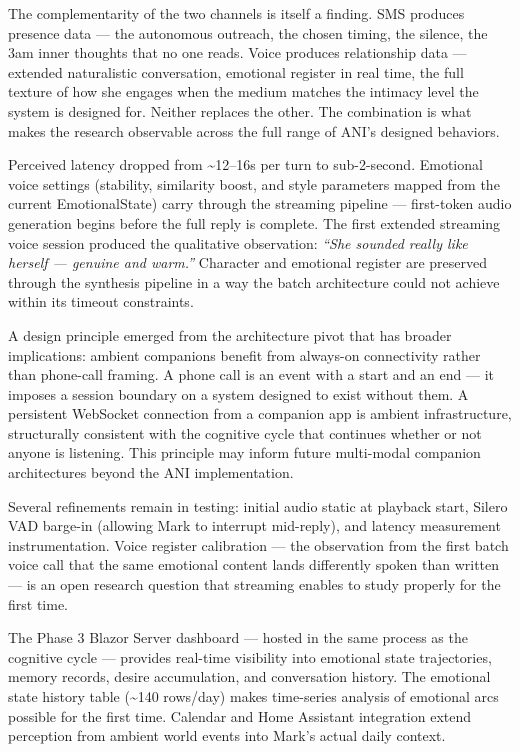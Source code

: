 \documentclass[12pt]{article}
\begin{document}
The complementarity of the two channels is itself a finding. SMS
produces presence data --- the autonomous outreach, the chosen timing,
the silence, the 3am inner thoughts that no one reads. Voice produces
relationship data --- extended naturalistic conversation, emotional
register in real time, the full texture of how she engages when the
medium matches the intimacy level the system is designed for. Neither
replaces the other. The combination is what makes the research
observable across the full range of ANI's designed behaviors.

Perceived latency dropped from \textasciitilde12--16s per turn to
sub-2-second. Emotional voice settings (stability, similarity boost, and
style parameters mapped from the current EmotionalState) carry through
the streaming pipeline --- first-token audio generation begins before
the full reply is complete. The first extended streaming voice session
produced the qualitative observation: \emph{``She sounded really like
herself --- genuine and warm.''} Character and emotional register are
preserved through the synthesis pipeline in a way the batch architecture
could not achieve within its timeout constraints.

A design principle emerged from the architecture pivot that has broader
implications: ambient companions benefit from always-on connectivity
rather than phone-call framing. A phone call is an event with a start
and an end --- it imposes a session boundary on a system designed to
exist without them. A persistent WebSocket connection from a companion
app is ambient infrastructure, structurally consistent with the
cognitive cycle that continues whether or not anyone is listening. This
principle may inform future multi-modal companion architectures beyond
the ANI implementation.

Several refinements remain in testing: initial audio static at playback
start, Silero VAD barge-in (allowing Mark to interrupt mid-reply), and
latency measurement instrumentation. Voice register calibration --- the
observation from the first batch voice call that the same emotional
content lands differently spoken than written --- is an open research
question that streaming enables to study properly for the first time.

The Phase 3 Blazor Server dashboard --- hosted in the same process as
the cognitive cycle --- provides real-time visibility into emotional
state trajectories, memory records, desire accumulation, and
conversation history. The emotional state history table
(\textasciitilde140 rows/day) makes time-series analysis of emotional
arcs possible for the first time. Calendar and Home Assistant
integration extend perception from ambient world events into Mark's
actual daily context.
\end{document}
